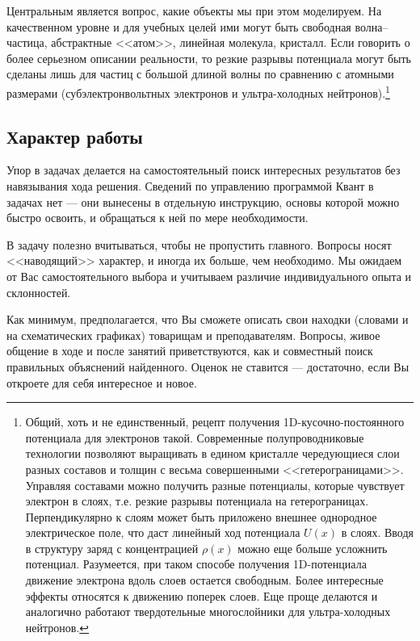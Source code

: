 \documentclass[12pt]{article}
\begin{document}
Центральным является вопрос, какие объекты мы при этом моделируем. На качественном уровне и для учебных целей ими могут быть свободная волна--частица, абстрактные <<атом>>, линейная молекула, кристалл. Если говорить о более серьезном описании реальности, то резкие разрывы потенциала могут быть сделаны лишь для частиц с большой длиной волны по сравнению с атомными размерами (субэлектронвольтных электронов и ультра-холодных нейтронов).\footnote[4]{Общий, хоть и не единственный, рецепт получения 1D-кусочно-постоянного потенциала для электронов такой.
Современные полупроводниковые технологии позволяют выращивать в едином кристалле чередующиеся слои разных составов и толщин с весьма совершенными <<гетерограницами>>. Управляя составами можно получить разные потенциалы, которые чувствует электрон в слоях, т.е. резкие разрывы потенциала на гетерограницах. Перпендикулярно к слоям может быть приложено внешнее однородное электрическое поле, что даст линейный ход потенциала $U(x)$ в слоях. Вводя в структуру заряд с концентрацией $\rho(x)$ можно еще больше усложнить потенциал.%
Разумеется, при таком способе получения 1D-потенциала движение электрона вдоль слоев остается свободным. Более интересные эффекты относятся к движению поперек слоев. Еще проще делаются и аналогично работают твердотельные многослойники для ультра-холодных нейтронов.}


\hypertarget{character}{}\subsection{Характер работы}
Упор в задачах делается на самостоятельный поиск интересных
результатов без навязывания хода решения.
Сведений по управлению программой Квант в задачах нет ---
они вынесены в отдельную инструкцию, основы которой
можно быстро освоить, и обращаться к ней по мере необходимости.

В задачу полезно вчитываться, чтобы не пропустить главного.
Вопросы носят <<наводящий>> характер,
и иногда их больше, чем необходимо. %
Мы ожидаем от Вас самостоятельного выбора и учитываем
различие индивидуального опыта и склонностей.

Как минимум, предполагается, что Вы сможете описать
свои находки (словами и на
схематических графиках) товарищам и преподавателям.
Вопросы, живое общение в ходе и после занятий приветствуются,
как и совместный поиск правильных объяснений найденного.
Оценок не ставится ---
достаточно, если Вы откроете для себя интересное и новое.
\end{document}
